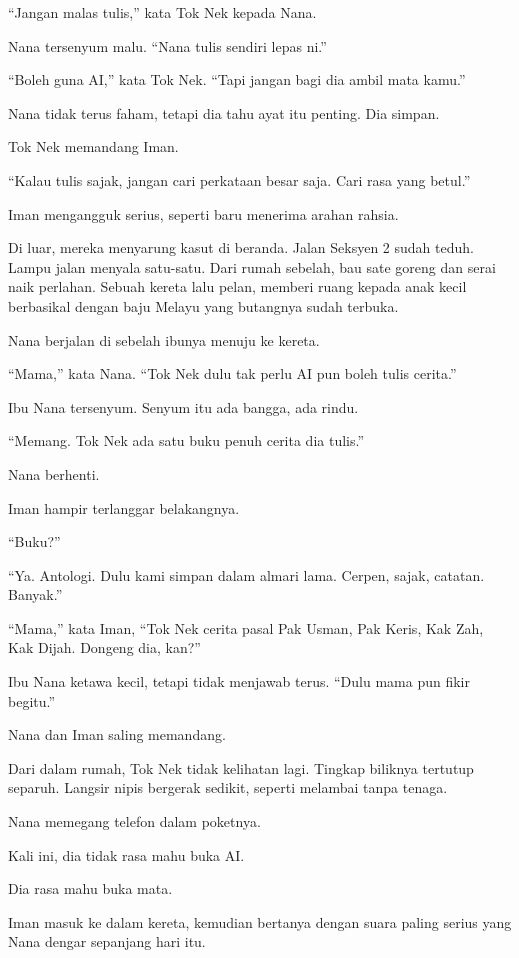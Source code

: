 \documentclass[
  11pt,
  a5paper,
  openany,
  oneside]{book}
\begin{document}
``Jangan malas tulis,'' kata Tok Nek kepada Nana.

Nana tersenyum malu. ``Nana tulis sendiri lepas ni.''

``Boleh guna AI,'' kata Tok Nek. ``Tapi jangan bagi dia ambil mata
kamu.''

Nana tidak terus faham, tetapi dia tahu ayat itu penting. Dia simpan.

Tok Nek memandang Iman.

``Kalau tulis sajak, jangan cari perkataan besar saja. Cari rasa yang
betul.''

Iman mengangguk serius, seperti baru menerima arahan rahsia.

Di luar, mereka menyarung kasut di beranda. Jalan Seksyen 2 sudah teduh.
Lampu jalan menyala satu-satu. Dari rumah sebelah, bau sate goreng dan
serai naik perlahan. Sebuah kereta lalu pelan, memberi ruang kepada anak
kecil berbasikal dengan baju Melayu yang butangnya sudah terbuka.

Nana berjalan di sebelah ibunya menuju ke kereta.

``Mama,'' kata Nana. ``Tok Nek dulu tak perlu AI pun boleh tulis
cerita.''

Ibu Nana tersenyum. Senyum itu ada bangga, ada rindu.

``Memang. Tok Nek ada satu buku penuh cerita dia tulis.''

Nana berhenti.

Iman hampir terlanggar belakangnya.

``Buku?''

``Ya. Antologi. Dulu kami simpan dalam almari lama. Cerpen, sajak,
catatan. Banyak.''

``Mama,'' kata Iman, ``Tok Nek cerita pasal Pak Usman, Pak Keris, Kak
Zah, Kak Dijah. Dongeng dia, kan?''

Ibu Nana ketawa kecil, tetapi tidak menjawab terus. ``Dulu mama pun
fikir begitu.''

Nana dan Iman saling memandang.

Dari dalam rumah, Tok Nek tidak kelihatan lagi. Tingkap biliknya
tertutup separuh. Langsir nipis bergerak sedikit, seperti melambai tanpa
tenaga.

Nana memegang telefon dalam poketnya.

Kali ini, dia tidak rasa mahu buka AI.

Dia rasa mahu buka mata.

Iman masuk ke dalam kereta, kemudian bertanya dengan suara paling serius
yang Nana dengar sepanjang hari itu.
\end{document}
